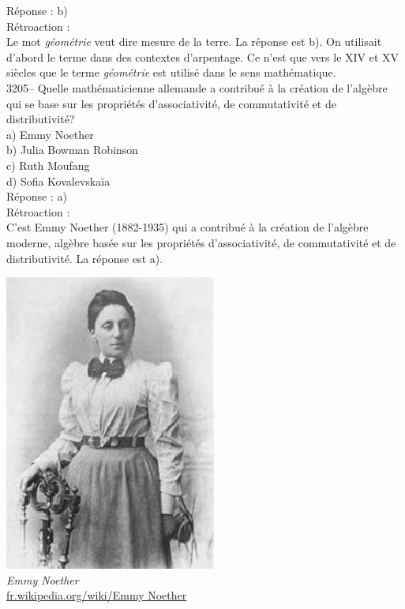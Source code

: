 \documentclass[letterpaper, 12pt]{article}
\begin{document}
R\'eponse : b)\\

R\'etroaction :\\
Le mot \emph{g\'eom\'etrie} veut dire \og mesure de la terre\fg. La r\'eponse est b). On utilisait d'abord le terme dans des contextes d'arpentage. Ce n'est que vers le {\scriptsize XIV\ieme{}} et {\scriptsize XV\ieme{}} si\`ecles que le terme \emph{g\'eom\'etrie} est utilis\'e dans le sens math\'ematique.\\



3205-- Quelle math\'ematicienne allemande a contribu\'e \`a la cr\'eation de l'alg\`ebre qui se base sur les propri\'et\'es d'associativit\'e, de commutativit\'e et de distributivit\'e?\\

a) Emmy Noether\\
b) Julia Bowman Robinson\\
c) Ruth Moufang\\
d) Sofia Kovalevska\"ia\\

R\'eponse : a)\\

R\'etroaction :\\
C'est Emmy Noether (1882-1935) qui a contribu\'e \`a la cr\'eation de l'alg\`ebre moderne, alg\`ebre bas\'ee sur les propri\'et\'es d'associativit\'e, de commutativit\'e et de distributivit\'e. La r\'eponse est a).
\begin{center}
\includegraphics[scale=0.65]{Noether.eps}\\
\emph{{\small Emmy Noether}}\\
\href{http://fr.wikipedia.org/wiki/Emmy_Noether}{fr.wikipedia.org/wiki/Emmy Noether}\\[5mm]
\end{center}
\end{document}
